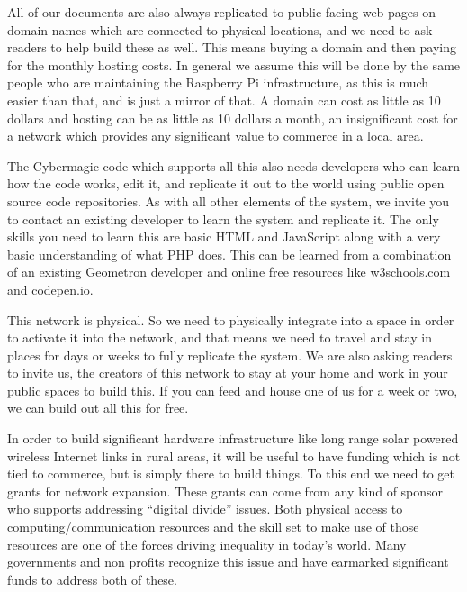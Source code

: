 All of our documents are also always replicated to public-facing web
pages on domain names which are connected to physical locations, and we
need to ask readers to help build these as well. This means buying a
domain and then paying for the monthly hosting costs. In general we
assume this will be done by the same people who are maintaining the
Raspberry Pi infrastructure, as this is much easier than that, and is
just a mirror of that. A domain can cost as little as 10 dollars and
hosting can be as little as 10 dollars a month, an insignificant cost
for a network which provides any significant value to commerce in a
local area.

The Cybermagic code which supports all this also needs developers who
can learn how the code works, edit it, and replicate it out to the world
using public open source code repositories. As with all other elements
of the system, we invite you to contact an existing developer to learn
the system and replicate it. The only skills you need to learn this are
basic HTML and JavaScript along with a very basic understanding of what
PHP does. This can be learned from a combination of an existing
Geometron developer and online free resources like w3schools.com and
codepen.io.

This network is physical. So we need to physically integrate into a
space in order to activate it into the network, and that means we need
to travel and stay in places for days or weeks to fully replicate the
system. We are also asking readers to invite us, the creators of this
network to stay at your home and work in your public spaces to build
this. If you can feed and house one of us for a week or two, we can
build out all this for free.

In order to build significant hardware infrastructure like long range
solar powered wireless Internet links in rural areas, it will be useful
to have funding which is not tied to commerce, but is simply there to
build things. To this end we need to get grants for network expansion.
These grants can come from any kind of sponsor who supports addressing
``digital divide'' issues. Both physical access to
computing/communication resources and the skill set to make use of those
resources are one of the forces driving inequality in today's world.
Many governments and non profits recognize this issue and have earmarked
significant funds to address both of these.

